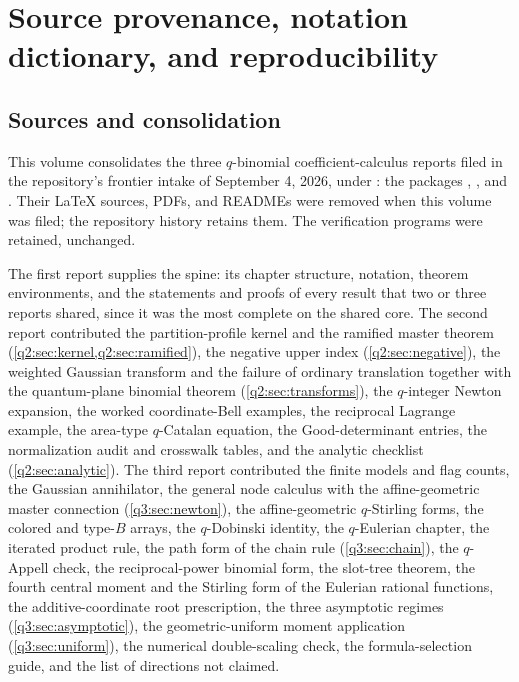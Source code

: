 \documentclass[11pt,a4paper,oneside,openany]{book}
\theoremstyle{definition}
\theoremstyle{remark}
\begin{document}
\chapter{Source provenance, notation dictionary, and reproducibility}
\label{q1:qcc:provenance}
\section{Sources and consolidation}
This volume consolidates the three \(q\)-binomial coefficient-calculus
reports filed in the repository's frontier intake of September 4, 2026,
under : the packages
, ,
and . Their \LaTeX{} sources, PDFs,
and READMEs were removed when this volume was filed; the repository history
retains them. The verification programs were retained, unchanged.

The first report supplies the spine: its chapter structure, notation,
theorem environments, and the statements and proofs of every result that
two or three reports shared, since it was the most complete on the shared
core. The second report contributed the partition-profile kernel and the
ramified master theorem (\cref{q2:sec:kernel,q2:sec:ramified}), the negative
upper index (\cref{q2:sec:negative}), the weighted Gaussian transform and the
failure of ordinary translation together with the quantum-plane binomial
theorem (\cref{q2:sec:transforms}), the \(q\)-integer Newton expansion, the
worked coordinate-Bell examples, the reciprocal Lagrange example, the
area-type \(q\)-Catalan equation, the Good-determinant entries, the
normalization audit and crosswalk tables, and the analytic checklist
(\cref{q2:sec:analytic}). The third report contributed the finite models and
flag counts, the Gaussian annihilator, the general node calculus with the
affine-geometric master connection (\cref{q3:sec:newton}), the
affine-geometric \(q\)-Stirling forms, the colored and type-\(B\) arrays, the
\(q\)-Dobinski identity, the \(q\)-Eulerian chapter, the iterated product
rule, the path form of the chain rule (\cref{q3:sec:chain}), the \(q\)-Appell
check, the reciprocal-power binomial form, the slot-tree theorem, the fourth
central moment and the Stirling form of the Eulerian rational functions, the
additive-coordinate root prescription, the three asymptotic regimes
(\cref{q3:sec:asymptotic}), the geometric-uniform moment application
(\cref{q3:sec:uniform}), the numerical double-scaling check, the
formula-selection guide, and the list of directions not claimed.
\end{document}

